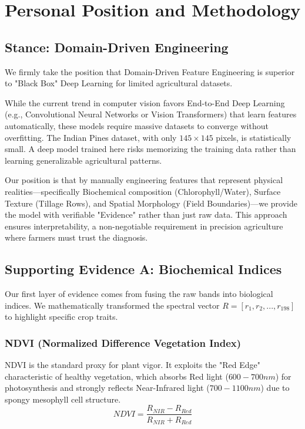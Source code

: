 \documentclass[conference]{IEEEtran}
\begin{document}
\section{Personal Position and Methodology}

\subsection{Stance: Domain-Driven Engineering}
We firmly take the position that Domain-Driven Feature Engineering is superior to "Black Box" Deep Learning for limited agricultural datasets. 

While the current trend in computer vision favors End-to-End Deep Learning (e.g., Convolutional Neural Networks or Vision Transformers) that learn features automatically, these models require massive datasets to converge without overfitting. The Indian Pines dataset, with only $145 \times 145$ pixels, is statistically small. A deep model trained here risks memorizing the training data rather than learning generalizable agricultural patterns.

Our position is that by manually engineering features that represent physical realities—specifically Biochemical composition (Chlorophyll/Water), Surface Texture (Tillage Rows), and Spatial Morphology (Field Boundaries)—we provide the model with verifiable "Evidence" rather than just raw data. This approach ensures interpretability, a non-negotiable requirement in precision agriculture where farmers must trust the diagnosis.

\subsection{Supporting Evidence A: Biochemical Indices}
Our first layer of evidence comes from fusing the raw bands into biological indices. We mathematically transformed the spectral vector $R = [r_1, r_2, ..., r_{198}]$ to highlight specific crop traits.

\subsubsection{NDVI (Normalized Difference Vegetation Index)}
NDVI is the standard proxy for plant vigor. It exploits the "Red Edge" characteristic of healthy vegetation, which absorbs Red light ($600-700nm$) for photosynthesis and strongly reflects Near-Infrared light ($700-1100nm$) due to spongy mesophyll cell structure.
\begin{equation}
    NDVI = \frac{R_{NIR} - R_{Red}}{R_{NIR} + R_{Red}}
\end{equation}
\end{document}
